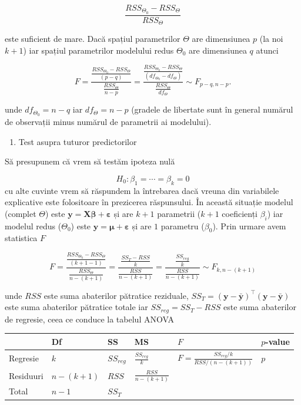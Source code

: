 \documentclass[]{article}
\providecommand{\tightlist}{%
  \setlength{\itemsep}{0pt}\setlength{\parskip}{0pt}}
\begin{document}
\[
\frac{RSS_{\Theta_0}-RSS_{\Theta}}{RSS_{\Theta}}
\]

este suficient de mare. Dacă spațiul parametrilor \(\Theta\) are
dimensiunea \(p\) (la noi \(k+1\)) iar spațiul parametrilor modelului
redus \(\Theta_0\) are dimensiunea \(q\) atunci

\[
F = \frac{\frac{RSS_{\Theta_0}-RSS_{\Theta}}{(p-q)}}{\frac{RSS_{\Theta}}{n-p}} = \frac{\frac{RSS_{\Theta_0}-RSS_{\Theta}}{(df_{\Theta_0}-df_{\Theta})}}{\frac{RSS_{\Theta}}{df_{\Theta}}} \sim F_{p-q,n-p}.
\]

unde \(df_{\Theta_0}=n-q\) iar \(df_{\Theta} = n-p\) (gradele de
libertate sunt în general numărul de observații minus numărul de
parametrii ai modelului).

\begin{enumerate}
\def\labelenumi{\alph{enumi})}
\tightlist
\item
  Test asupra tuturor predictorilor
\end{enumerate}

Să presupunem că vrem să testăm ipoteza nulă

\[
H_0: \beta_1 = \cdots = \beta_k = 0
\] cu alte cuvinte vrem să răspundem la întrebarea dacă vreuna din
variabilele explicative este folositoare în prezicerea răspunsului. În
această situație modelul (complet \(\Theta\)) este
\(\boldsymbol y = \boldsymbol X\boldsymbol \beta+\boldsymbol\varepsilon\)
și are \(k+1\) parametrii (\(k+1\) coeficienți \(\beta_i\)) iar modelul
redus (\(\Theta_0\)) este
\(\boldsymbol y = \boldsymbol \mu+\boldsymbol\varepsilon\) și are \(1\)
parametru (\(\beta_0\)). Prin urmare avem statistica \(F\)

\[
F = \frac{\frac{RSS_{\Theta_0}-RSS_{\Theta}}{(k+1-1)}}{\frac{RSS_{\Theta}}{n-(k+1)}} = \frac{\frac{SS_{T}-RSS}{k}}{\frac{RSS}{n-(k+1)}}= \frac{\frac{SS_{reg}}{k}}{\frac{RSS}{n-(k+1)}}\sim F_{k,n-(k+1)}
\]

unde \(RSS\) este suma abaterilor pătratice reziduale,
\(SS_T=(\boldsymbol y - \bar{\boldsymbol y})^\intercal(\boldsymbol y - \bar{\boldsymbol y})\)
este suma abaterilor pătratice totale iar \(SS_{reg}=SS_{T}-RSS\) este
suma abaterilor de regresie, ceea ce conduce la tabelul ANOVA

\begin{longtable}[]{@{}llllll@{}}
\toprule
& Df & SS & MS & \(F\) & \(p\)-value\tabularnewline
\midrule
\endhead
Regresie & \(k\) & \(SS_{reg}\) & \(\frac{SS_{reg}}{k}\) &
\(F=\frac{SS_{reg}/k}{RSS/(n-(k+1))}\) & \(p\)\tabularnewline
Residuuri & \(n - (k+1)\) & \(RSS\) & \(\frac{RSS}{n-(k+1)}\) &
&\tabularnewline
Total & \(n-1\) & \(SS_{T}\) & & &\tabularnewline
\bottomrule
\end{longtable}
\end{document}
